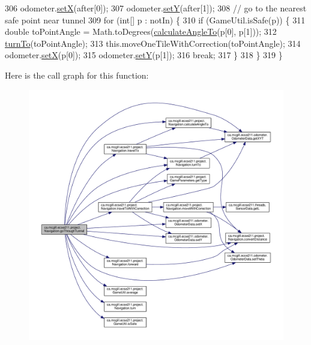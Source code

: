 \begin{DoxyCode}
306     odometer.\hyperlink{classca_1_1mcgill_1_1ecse211_1_1odometer_1_1_odometer_data_a2911d7215e47f3064defe016b46bfeef}{setX}(after[0]);
307     odometer.\hyperlink{classca_1_1mcgill_1_1ecse211_1_1odometer_1_1_odometer_data_a82986438cd462e66520bc62bb4bd2b75}{setY}(after[1]);
308     \textcolor{comment}{// go to the nearest safe point near tunnel}
309     \textcolor{keywordflow}{for} (\textcolor{keywordtype}{int}[] p : notIn) \{
310       \textcolor{keywordflow}{if} (GameUtil.isSafe(p)) \{
311         \textcolor{keywordtype}{double} toPointAngle = Math.toDegrees(\hyperlink{classca_1_1mcgill_1_1ecse211_1_1project_1_1_navigation_a4376e54162df8f123ca3b52e4fd2f38d}{calculateAngleTo}(p[0], p[1]));
312         \hyperlink{classca_1_1mcgill_1_1ecse211_1_1project_1_1_navigation_a3bbe0645f2b3b3d0986b4a707fb5a00c}{turnTo}(toPointAngle);
313         this.moveOneTileWithCorrection(toPointAngle);
314         odometer.\hyperlink{classca_1_1mcgill_1_1ecse211_1_1odometer_1_1_odometer_data_a2911d7215e47f3064defe016b46bfeef}{setX}(p[0]);
315         odometer.\hyperlink{classca_1_1mcgill_1_1ecse211_1_1odometer_1_1_odometer_data_a82986438cd462e66520bc62bb4bd2b75}{setY}(p[1]);
316         \textcolor{keywordflow}{break};
317       \}
318     \}
319   \}
\end{DoxyCode}
Here is the call graph for this function\+:
\nopagebreak
\begin{figure}[H]
\begin{center}
\leavevmode
\includegraphics[width=350pt]{classca_1_1mcgill_1_1ecse211_1_1project_1_1_navigation_a4b52e605d3ea2f9bcd9481ae2c69ba39_cgraph}
\end{center}
\end{figure}
